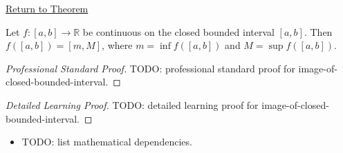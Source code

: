 \newpage
{}
\label{prf:image-of-closed-bounded-interval}

\begin{remark*}[Return]
\hyperref[thm:image-of-closed-bounded-interval]{Return to Theorem}
\end{remark*}

\begin{theorem*}
Let $f : [a,b] \to \mathbb{R}$ be continuous on the closed bounded interval $[a,b]$. Then $f([a,b]) = [m, M]$, where $m = \inf f([a,b])$ and $M = \sup f([a,b])$.
\end{theorem*}

\begin{proof}[Professional Standard Proof]
\LRAProofBodyStart
TODO: professional standard proof for image-of-closed-bounded-interval.
\end{proof}

\begin{proof}[Detailed Learning Proof]
\LRAProofBodyStart
TODO: detailed learning proof for image-of-closed-bounded-interval.
\end{proof}

\begin{remark*}
\end{remark*}

\begin{dependencies}
\begin{itemize}
  \item TODO: list mathematical dependencies.
\end{itemize}
\end{dependencies}

\clearpage
